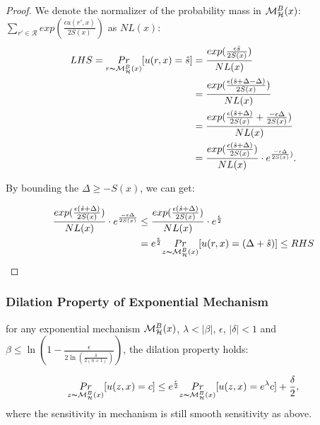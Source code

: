 \documentclass[sigconf, anonymous]{acmart}
\begin{document}
\begin{proof}

We denote the normalizer of the probability mass in $\mathcal{M}^{B}_{\mathcal{H}}(x)$: $\sum_{r' \in \mathcal{R}}exp(\frac{\epsilon u(r',x)}{2 S(x)})$ as $NL(x)$:
\begin{equation*}
\begin{split}
LHS 
  = \underset{r \thicksim \mathcal{M}^{B}_{\mathcal{H}}(x)}{Pr}[u(r,x) = \hat{s}]
& = \frac{exp(\frac{\epsilon \hat{s}}{2 S(x)})}{NL(x)}\\
& = \frac{exp(\frac{\epsilon (\hat{s} + \Delta - \Delta)}{2 S(x)})}{NL(x)}\\
& = \frac{exp(\frac{\epsilon (\hat{s} + \Delta)}{2 S(x)} + \frac{- \epsilon \Delta}{2 S(x)})}{NL(x)}\\
& = \frac{exp(\frac{\epsilon (\hat{s} + \Delta)}{2 S(x)})}{NL(x)} \cdot e^{\frac{- \epsilon \Delta}{2 S(x)})}.\\
\end{split}
\end{equation*}

By bounding the $\Delta \geq -S(x)$, we can get:

\begin{equation*}
\begin{split}
\frac{exp(\frac{\epsilon (\hat{s} + \Delta)}{2 S(x)})}{NL(x)} \cdot e^{\frac{- \epsilon \Delta}{2 S(x)}}
& \leq \frac{exp(\frac{\epsilon (\hat{s} + \Delta)}{2 S(x)})}{NL(x)} \cdot e^{\frac{\epsilon}{2}}\\
&  =  e^{\frac{\epsilon}{2}} \underset{z \thicksim \mathcal{M}^{B}_{\mathcal{H}}(x)}{Pr}[u(r,x) = (\Delta + \hat{s})] \leq RHS\\
\end{split}
\end{equation*}

\end{proof}

\subsubsection{Dilation Property of Exponential Mechanism}
\begin{lem}
for any exponential mechanism $\mathcal{M}^{B}_{\mathcal{H}}(x)$, $\lambda < |\beta|$, $\epsilon$, $|\delta| < 1$ and $\beta \leq \ln(1 - \frac{\epsilon}{2 \ln (\frac{\delta}{2 (n + 1)})})$, the dilation property holds:

\begin{equation*}
\underset{z \thicksim \mathcal{M}^{B}_{\mathcal{H}}(x)}{Pr}[u(z,x) = c]
\leq
e^{\frac{\epsilon}{2}} \underset{z \thicksim \mathcal{M}^{B}_{\mathcal{H}}(x)}{Pr}[u(z,x) = e^{\lambda} c] + \frac{\delta}{2},
\end{equation*}
where the sensitivity in mechanism is still smooth sensitivity as above.
\end{lem}
\end{document}
